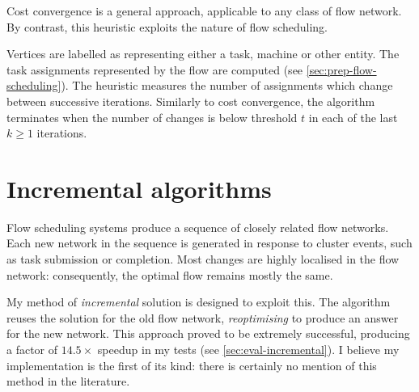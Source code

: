 Cost convergence is a general approach, applicable to any class of flow network. By contrast, this heuristic exploits the nature of flow scheduling.

Vertices are labelled as representing either a task, machine or other entity. The task assignments represented by the flow are computed (see \cref{sec:prep-flow-scheduling}). The heuristic measures the number of assignments which change between successive iterations. Similarly to cost convergence, the algorithm terminates when the number of changes is below threshold $t$ in each of the last $k \geq 1$ iterations.


\section{Incremental algorithms} \label{sec:impl-incremental}


Flow scheduling systems produce a sequence of closely related flow networks. Each new network in the sequence is generated in response to cluster events, such as task submission or completion. Most changes are highly localised in the flow network: consequently, the optimal flow remains mostly the same.

My method of \emph{incremental} solution is designed to exploit this. The algorithm reuses the solution for the old flow network, \emph{reoptimising} to produce an answer for the new network. This approach proved to be extremely successful, producing a factor of $14.5\times$ speedup in my tests (see \cref{sec:eval-incremental}). I believe my implementation is the first of its kind: there is certainly no mention of this method in the literature.

